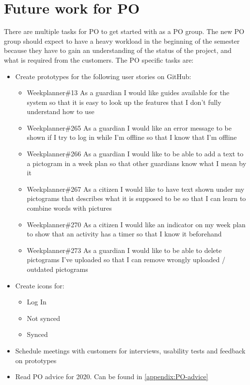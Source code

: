 \section{Future work for PO}
There are multiple tasks for PO to get started with as a PO group.
The new PO group should expect to have a heavy workload in the beginning of the semester because they have to gain an understanding of the status of the project, and what is required from the customers.
The PO specific tasks are:

\begin{itemize}
    \item Create prototypes for the following user stories on GitHub:
    \begin{itemize}
        \item Weekplanner\#13 As a guardian I would like guides available for the system so that it is easy to look up the features that I don't fully understand how to use
        \item Weekplanner\#265 As a guardian I would like an error message to be shown if I try to log in while I'm offline so that I know that I'm offline
        \item Weekplanner\#266 As a guardian I would like to be able to add a text to a pictogram in a week plan so that other guardians know what I mean by it
        \item Weekplanner\#267 As a citizen I would like to have text shown under my pictograms that describes what it is supposed to be so that I can learn to combine words with pictures 
        \item Weekplanner\#270 As a citizen I would like an indicator on my week plan to show that an activity has a timer so that I know it beforehand
        \item Weekplanner\#273 As a guardian I would like to be able to delete pictograms I've uploaded so that I can remove wrongly uploaded / outdated pictograms 
    \end{itemize}
    \item Create icons for:
    \begin{itemize}
        \item Log In
        \item Not synced
        \item Synced
    \end{itemize}
    \item Schedule meetings with customers for interviews, usability tests and feedback on prototypes
    \item Read PO advice for 2020. Can be found in \autoref{appendix:PO-advice}
\end{itemize}
